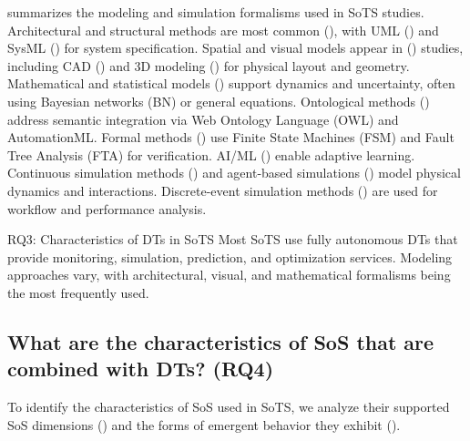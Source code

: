 

 summarizes the modeling and simulation formalisms used in SoTS studies. Architectural and structural methods are most common (), with UML () and SysML () for system specification. Spatial and visual models appear in () studies, including CAD () and 3D modeling () for physical layout and geometry. Mathematical and statistical models () support dynamics and uncertainty, often using Bayesian networks (BN) or general equations.
Ontological methods () address semantic integration via Web Ontology Language (OWL) and AutomationML. Formal methods () use Finite State Machines (FSM) and Fault Tree Analysis (FTA) for verification. AI/ML () enable adaptive learning. Continuous simulation methods () and agent-based simulations () model physical dynamics and interactions. Discrete-event simulation methods () are used for workflow and performance analysis.


\begin{conclusionframe}{RQ3: Characteristics of DTs in SoTS}
Most SoTS use fully autonomous DTs that provide monitoring, simulation, prediction, and optimization services. Modeling approaches vary, with architectural, visual, and mathematical formalisms being the most frequently used.
\end{conclusionframe}


\subsection{What are the characteristics of SoS that are combined with DTs? (RQ4)}\label{results-rq4}

To identify the characteristics of SoS used in SoTS, we analyze their supported SoS dimensions () and the forms of emergent behavior they exhibit ().

